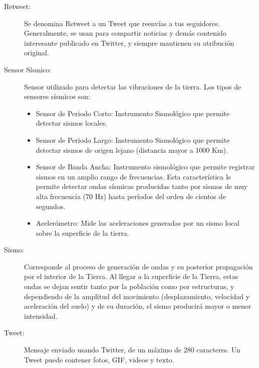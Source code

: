 \begin{description}
\item[Retweet:] Se denomina Retweet a un Tweet que reenvías a tus seguidores. Generalmente, se usan para compartir noticias y demás contenido interesante publicado en Twitter, y siempre mantienen su atribución original.\cite{twitterglosary}

\item[Sensor Sísmico:] Sensor utilizado para detectar las vibraciones de la tierra.\cite{csnglosary} Los tipos de sensores sísmicos son:
	\begin{itemize}
	\item Sensor de Periodo Corto: Instrumento Sismológico que permite detectar sismos locales.
	\item Sensor de Periodo Largo: Instrumento Sismológico que permite detectar sismos de origen lejano (distancia mayor a 1000 Km).
	\item Sensor de Banda Ancha: Instrumento sismológico que permite registrar sismos en un amplio rango de frecuencias. Esta característica le permite detectar ondas sísmicas producidas tanto por sismos de muy alta frecuencia (70 Hz) hasta períodos del orden de cientos de segundos.
	\item Acelerómetro: Mide las aceleraciones generadas por un sismo local sobre la superficie de la tierra.
	\end{itemize}
	
\item[Sismo:] Corresponde al proceso de generación de ondas y su posterior propagación por el interior de la Tierra. Al llegar a la superficie de la Tierra, estas ondas se dejan sentir tanto por la población como por estructuras, y dependiendo de la amplitud del movimiento (desplazamiento, velocidad y aceleración del suelo) y de su duración, el sismo producirá mayor o menor intensidad.\cite{csnglosary}

\item[Tweet:] Mensaje enviado usando Twitter, de un máximo de 280 caracteres. Un Tweet puede contener fotos, GIF, videos y texto.\cite{twitterglosary}

\end{description}


